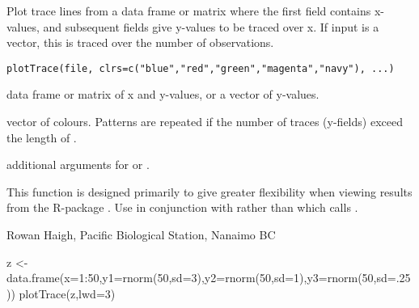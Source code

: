 \documentclass[letterpaper]{book}
\begin{document}
\begin{Description}\relax
Plot trace lines from a data frame or matrix where the first field contains x-values, 
and subsequent fields give y-values to be traced over x. If input is a vector, 
this is traced over the number of observations.
\end{Description}
\begin{Usage}
\begin{verbatim}
plotTrace(file, clrs=c("blue","red","green","magenta","navy"), ...)
\end{verbatim}
\end{Usage}
\begin{Arguments}
\begin{ldescription}
\item[\code{file}] data frame or matrix of x and y-values, or a vector of y-values.
\item[\code{clrs}] vector of colours. Patterns are repeated if the number 
of traces (y-fields) exceed the length of .
\item[\code{...}] additional arguments for  or .
\end{ldescription}
\end{Arguments}
\begin{Details}\relax
This function is designed primarily to give greater flexibility when viewing 
results from the R-package . Use  in conjunction with 
 rather than  
which calls .
\end{Details}
\begin{Author}\relax
Rowan Haigh, Pacific Biological Station, Nanaimo BC
\end{Author}
\begin{Examples}
\begin{ExampleCode}
z <- data.frame(x=1:50,y1=rnorm(50,sd=3),y2=rnorm(50,sd=1),y3=rnorm(50,sd=.25))
plotTrace(z,lwd=3)
\end{ExampleCode}
\end{Examples}
\end{document}
